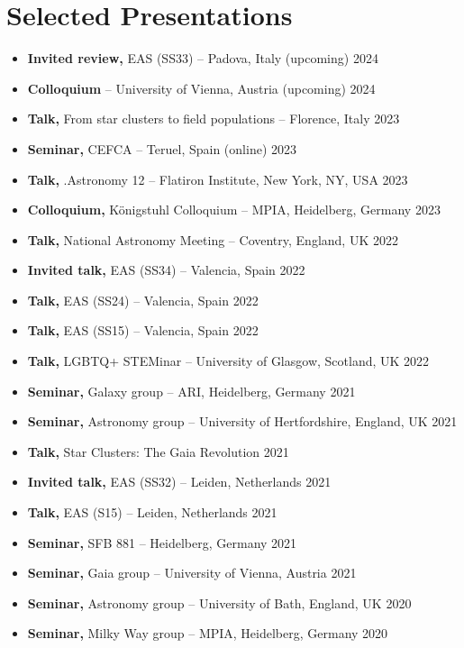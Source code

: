 \section*{Selected Presentations}

\begin{itemize}
    \item \textbf{Invited review,} EAS (SS33) -- Padova, Italy \hfill (upcoming) 2024
    \item \textbf{Colloquium}  -- University of Vienna, Austria \hfill (upcoming) 2024
    \item \textbf{Talk,} From star clusters to field populations -- Florence, Italy \hfill 2023
    \item \textbf{Seminar,} CEFCA -- Teruel, Spain (online) \hfill 2023
    \item \textbf{Talk,} .Astronomy 12 -- Flatiron Institute, New York, NY, USA \hfill 2023
    \item \textbf{Colloquium,} Königstuhl Colloquium -- MPIA, Heidelberg, Germany \hfill 2023
    \item \textbf{Talk,} National Astronomy Meeting -- Coventry, England, UK \hfill 2022
    \item \textbf{Invited talk,} EAS (SS34) -- Valencia, Spain \hfill 2022
    \item \textbf{Talk,} EAS (SS24) -- Valencia, Spain \hfill 2022
    \item \textbf{Talk,} EAS (SS15) -- Valencia, Spain \hfill 2022
    \item \textbf{Talk,} LGBTQ+ STEMinar  -- University of Glasgow, Scotland, UK \hfill 2022
    \item \textbf{Seminar,} Galaxy group -- ARI, Heidelberg, Germany \hfill 2021
    \item \textbf{Seminar,} Astronomy group -- University of Hertfordshire, England, UK \hfill 2021
    \item \textbf{Talk,} Star Clusters: The Gaia Revolution \hfill 2021
    \item \textbf{Invited talk,} EAS (SS32) -- Leiden, Netherlands \hfill 2021
    \item \textbf{Talk,} EAS (S15) -- Leiden, Netherlands \hfill 2021
    \item \textbf{Seminar,} SFB 881 -- Heidelberg, Germany \hfill 2021
    \item \textbf{Seminar,} Gaia group -- University of Vienna, Austria \hfill 2021
    \item \textbf{Seminar,} Astronomy group -- University of Bath, England, UK \hfill 2020
    \item \textbf{Seminar,} Milky Way group -- MPIA, Heidelberg, Germany \hfill 2020
\end{itemize}